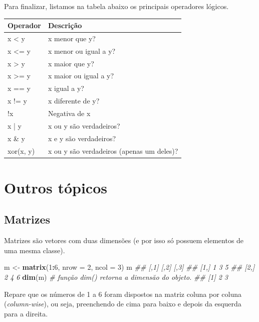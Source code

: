 \documentclass[]{book}
\newenvironment{Shaded}{\begin{snugshade}}{\end{snugshade}}
\newcommand{\CommentTok}[1]{\textcolor[rgb]{0.56,0.35,0.01}{\textit{#1}}}
\newcommand{\DataTypeTok}[1]{\textcolor[rgb]{0.13,0.29,0.53}{#1}}
\newcommand{\DecValTok}[1]{\textcolor[rgb]{0.00,0.00,0.81}{#1}}
\newcommand{\KeywordTok}[1]{\textcolor[rgb]{0.13,0.29,0.53}{\textbf{#1}}}
\newcommand{\NormalTok}[1]{#1}
\newcommand{\OperatorTok}[1]{\textcolor[rgb]{0.81,0.36,0.00}{\textbf{#1}}}
\newcommand{\StringTok}[1]{\textcolor[rgb]{0.31,0.60,0.02}{#1}}
\begin{document}
Para finalizar, listamos na tabela abaixo os principais operadores lógicos.

\begin{tabular}{l|l}
\hline
Operador & Descrição\\
\hline
x < y & x menor que y?\\
\hline
x <= y & x menor ou igual a y?\\
\hline
x > y & x maior que y?\\
\hline
x >= y & x maior ou igual a y?\\
\hline
x == y & x igual a y?\\
\hline
x != y & x diferente de y?\\
\hline
!x & Negativa de x\\
\hline
x | y & x ou y são verdadeiros?\\
\hline
x \& y & x e y são verdadeiros?\\
\hline
xor(x, y) & x ou y são verdadeiros (apenas um deles)?\\
\hline
\end{tabular}

\hypertarget{outros-tuxf3picos}{%
\section{Outros tópicos}\label{outros-tuxf3picos}}

\hypertarget{matrizes}{%
\subsection{Matrizes}\label{matrizes}}

Matrizes são vetores com duas dimensões (e por isso só possuem elementos de uma mesma classe).

\begin{Shaded}
\begin{Highlighting}[]
\NormalTok{m <-}\StringTok{ }\KeywordTok{matrix}\NormalTok{(}\DecValTok{1}\OperatorTok{:}\DecValTok{6}\NormalTok{, }\DataTypeTok{nrow =} \DecValTok{2}\NormalTok{, }\DataTypeTok{ncol =} \DecValTok{3}\NormalTok{)}
\NormalTok{m}
\CommentTok{##      [,1] [,2] [,3]}
\CommentTok{## [1,]    1    3    5}
\CommentTok{## [2,]    2    4    6}
\KeywordTok{dim}\NormalTok{(m) }\CommentTok{# funçăo dim() retorna a dimensăo do objeto.}
\CommentTok{## [1] 2 3}
\end{Highlighting}
\end{Shaded}

Repare que os números de 1 a 6 foram dispostos na matriz coluna por coluna (\emph{column-wise}), ou seja, preenchendo de cima para baixo e depois da esquerda para a direita.
\end{document}
